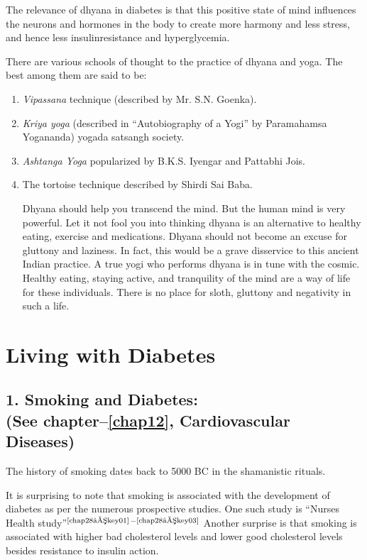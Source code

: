 The relevance of dhyana in diabetes is that this positive state of mind influences the neurons and hormones in the body to create more harmony and less stress, and hence less insulin\break resistance and hyperglycemia.

There are various schools of thought to the practice of dhyana and yoga. The best among them are said to be:

\begin{enumerate}[•]
\itemsep=0pt
\item \textit{Vipassana} technique (described by Mr. S.N. Goenka).
\item \textit{Kriya yoga} (described in “Autobiography of a Yogi” by Paramahamsa Yogananda) yogada satsangh society.
\item \textit{Ashtanga Yoga} popularized by B.K.S. Iyengar and Pattabhi Jois.
\item The tortoise technique described by Shirdi Sai Baba.

 Dhyana should help you transcend the mind. But the human mind is very powerful. Let it not fool you into thinking dhyana is an alternative to healthy eating, exercise and medications. Dhyana should not become an excuse for gluttony and laziness. In fact, this would be a grave disservice to this ancient Indian practice. A true yogi who performs dhyana is in tune with the cosmic. Healthy eating, staying active, and tranquility of the mind are a way of life for these indi\-viduals. There is no place for sloth, gluttony and negativity in such a life.
\end{enumerate}


\chapter{Living with Diabetes}\label{chap28}

\section*{1. Smoking and Diabetes:\\ (See chapter–\ref{chap12}, Cardiovascular Diseases)}

The history of smoking dates back to 5000 BC in the shamanistic rituals.

It is surprising to note that smoking is associated with the deve\-lopment of diabetes as per the numerous prospective studies. One such study is “Nurses Health study”$^{\text{\cite{chap28–key01}}}$$^-$$^{\text{\cite{chap28–key03}}}$ Another surprise is that smoking is associated with higher bad cholesterol levels and lower good chole\-sterol levels besides resistance to insulin action.


